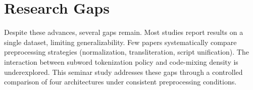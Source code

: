\section{Research Gaps}

Despite these advances, several gaps remain. Most studies report results on a single dataset, limiting generalizability. Few papers systematically compare preprocessing strategies (normalization, transliteration, script unification). The interaction between subword tokenization policy and code-mixing density is underexplored. This seminar study addresses these gaps through a controlled comparison of four architectures under consistent preprocessing conditions.

